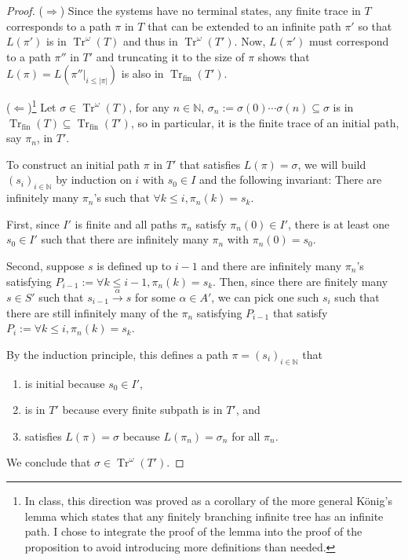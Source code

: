 \documentclass{tufte-handout} %
\theoremstyle{definition}
\theoremstyle{remark}
\newcommand{\N}{\mathbb{N}}
\newcommand{\0}{\textsf{0}}
\newcommand{\1}{\textsf{1}}
\newcommand{\action}[1]{\stackrel{#1}{\rightarrow}}
\DeclareMathOperator{\Tr}{Tr}
\begin{document}
\begin{proof}
	($\Rightarrow$) Since the systems have no terminal states, any finite trace in $T$ corresponds to a path $\pi$ in $T$ that can be extended to an infinite path $\pi'$ so that $L(\pi')$ is in $\Tr^{\omega}(T)$ and thus in $\Tr^{\omega}(T')$. Now, $L(\pi')$ must correspond to a path $\pi''$ in $T'$ and truncating it to the size of $\pi$ shows that $L(\pi) = L(\pi''|_{i\leq |\pi|})$ is also in $\Tr_{\text{fin}}(T')$.
	
	($\Leftarrow$)\footnote{In class, this direction was proved as a corollary of the more general K\"onig's lemma which states that any finitely branching infinite tree has an infinite path. I chose to integrate the proof of the lemma into the proof of the proposition to avoid introducing more definitions than needed.} Let $\sigma \in \Tr^{\omega}(T)$, for any $n\in \N$, $\sigma_n := \sigma(0)\cdots \sigma(n) \subseteq \sigma$ is in $\Tr_{\text{fin}}(T) \subseteq \Tr_{\text{fin}}(T')$, so in particular, it is the finite trace of an initial path, say $\pi_n$, in $T'$.
	
	To construct an initial path $\pi$ in $T'$ that satisfies $L(\pi) = \sigma$, we will build $(s_i)_{i\in\N}$ by induction on $i$ with $s_0 \in I$ and the following invariant: There are infinitely many $\pi_n$'s such that $\forall k\leq i, \pi_n(k) = s_k$.
	
	First, since $I'$ is finite and all paths $\pi_n$ satisfy $\pi_n(0)\in I'$, there is at least one $s_0 \in I'$ such that there are infinitely many $\pi_n$ with $\pi_n(0) = s_0$.
	
	Second, suppose $s$ is defined up to $i-1$ and there are infinitely many $\pi_n$'s satisfying $P_{i-1}:=\forall k\leq i-1, \pi_n(k) = s_k$. Then, since there are finitely many $s\in S'$ such that $s_{i-1}\action{\alpha} s$ for some $\alpha \in A'$, we can pick one such $s_i$ such that there are still infinitely many of the $\pi_n$ satisfying $P_{i-1}$ that satisfy $P_i := \forall k\leq i, \pi_n(k) = s_k$.
	
	By the induction principle, this defines a path $\pi = (s_i)_{i\in \N}$ that 
	\begin{enumerate}
		\item is initial because $s_0 \in I'$,
		\item is in $T'$ because every finite subpath is in $T'$, and 
		\item satisfies $L(\pi) = \sigma$ because $L(\pi_n) = \sigma_n$ for all $\pi_n$.
	\end{enumerate}
	We conclude that $\sigma \in \Tr^{\omega}(T')$.
\end{proof}
\end{document}
